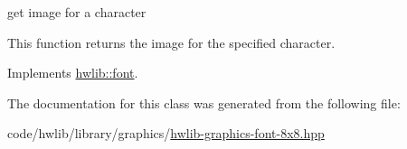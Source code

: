 get image for a character 

This function returns the image for the specified character. 

Implements \hyperlink{classhwlib_1_1font_a723595f70f1e042db23d3140b1d4cad8}{hwlib\+::font}.



The documentation for this class was generated from the following file\+:\begin{DoxyCompactItemize}
\item 
code/hwlib/library/graphics/\hyperlink{hwlib-graphics-font-8x8_8hpp}{hwlib-\/graphics-\/font-\/8x8.\+hpp}\end{DoxyCompactItemize}
